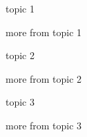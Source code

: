 \documentclass{beamer}
\begin{document}

\begin{frame}
topic 1
\end{frame}

\begin{frame}
more from topic 1
\end{frame}

\begin{frame}
topic 2
\end{frame}


\begin{frame}
more from topic 2
\end{frame}

\begin{frame}
topic 3
\end{frame}


\begin{frame}
more from topic 3
\end{frame}
\end{document}
